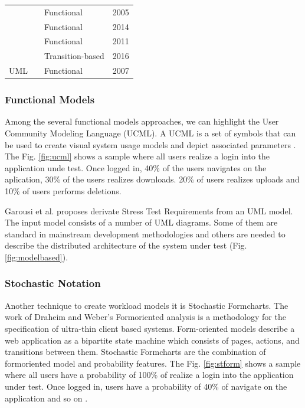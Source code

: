 \documentclass{report}
\begin{document}
\begin{table}[!h]
\begin{tabular}{|l|l|l|l|}
                                        & \cite{Kim2005}          & Functional           & 2005          \\ \cline{2-4}
                                        & \cite{Rodrigues2014}    & Functional           & 2014          \\ \cline{2-4}
                                        & \cite{Silveira2011}     & Functional           & 2011          \\ \cline{2-4}
                                        &
\cite{Vogele2016}    & Transition-based      & 2016          \\ \cline{2-4}


\multirow{-10}{*}{UML}                   & \cite{Lenz2007}         & Functional           & 2007          \\ \hline
\end{tabular}
\end{table}


\subsubsection{Functional Models}

Among the several functional models approaches, we can highlight the User Community Modeling Language (UCML). A UCML is a set of symbols that can be used to create visual system usage models and depict associated parameters \cite{Wang2013}. The Fig. \ref{fig:ucml} shows a sample where all users realize a login into the application unde test. Once logged in, 40\% of the users navigates on the aplication, 30\%  of the users realizes downloads. 20\% of users realizes uploads and 10\% of users performs deletions.

Garousi et al. proposes derivate Stress Test Requirements from an UML model. The input model consists of a number of UML diagrams. Some of
them are standard in mainstream development methodologies and others are needed to describe the distributed architecture of the system under test (Fig. \ref{fig:modelbased}).



\subsubsection{Stochastic Notation}



Another technique to create workload models it is Stochastic Formcharts. The work of Draheim and Weber’s Formoriented analysis is a methodology for the specification of ultra-thin client based systems. Form-oriented models describe a web application as a bipartite state machine which consists of pages, actions, and transitions between them. Stochastic Formcharts are the combination of formoriented model and probability features. The Fig. \ref{fig:stform} shows a sample where all users have a probability of 100\% of realize a login into the application under test. Once logged in, users have a probability of 40\% of navigate on the application and so on \cite{Draheim2006b}.
\end{document}

